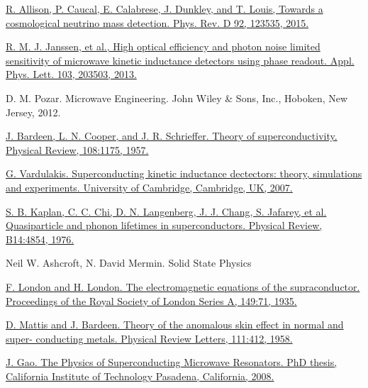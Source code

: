 \begin{thebibliography}{99}
\href{https://journals.aps.org/prd/abstract/10.1103/PhysRevD.92.123535}{
  R. Allison, P. Caucal, E. Calabrese, J. Dunkley, and T. Louis, Towards a cosmological neutrino mass detection. Phys. Rev. D 92, 123535, 2015.
}

\href{https://aip.scitation.org/doi/10.1063/1.4829657}{
  R. M. J. Janssen, et al., High optical efficiency and photon noise limited sensitivity of microwave kinetic inductance detectors using phase readout. Appl. Phys. Lett. 103, 203503, 2013.
}

D. M. Pozar. Microwave Engineering. John Wiley \& Sons, Inc., Hoboken, New Jersey, 2012.

\href{https://journals.aps.org/pr/abstract/10.1103/PhysRev.108.1175}
{J. Bardeen, L. N. Cooper, and J. R. Schrieffer. Theory of superconductivity. Physical
Review, 108:1175, 1957.
}

\href{G. Vardulakis. Superconducting kinetic inductance dectectors: theory, simulations and
experiments. University of Cambridge, Cambridge, UK, 2007.}
{G. Vardulakis. Superconducting kinetic inductance dectectors: theory, simulations and
experiments. University of Cambridge, Cambridge, UK, 2007.
}

\href{https://journals.aps.org/prb/abstract/10.1103/PhysRevB.14.4854}
{S. B. Kaplan, C. C. Chi, D. N. Langenberg, J. J. Chang, S. Jafarey, et al. Quasiparticle
and phonon lifetimes in superconductors. Physical Review, B14:4854, 1976.
}

Neil W. Ashcroft, N. David Mermin. Solid State Physics

\href{F. London and H. London. The electromagnetic equations of the supraconductor.
Proceedings of the Royal Society of London Series A, 149:71, 1935.
}{F. London and H. London. The electromagnetic equations of the supraconductor.
Proceedings of the Royal Society of London Series A, 149:71, 1935.
}

\href{D. Mattis and J. Bardeen. Theory of the anomalous skin effect in normal and super-
conducting metals. Physical Review Letters, 111:412, 1958.}
{D. Mattis and J. Bardeen. Theory of the anomalous skin effect in normal and super-
conducting metals. Physical Review Letters, 111:412, 1958.}

\href{https://resolver.caltech.edu/CaltechETD:etd-06092008-235549}{
J. Gao. The Physics of Superconducting Microwave Resonators. PhD thesis, California Institute of Technology Pasadena, California, 2008.
}


\end{thebibliography}
